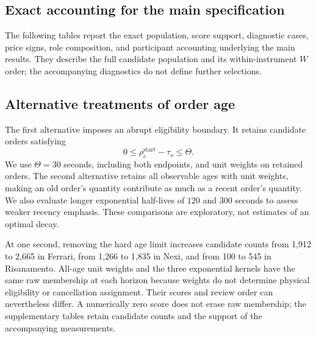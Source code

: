 \documentclass[11pt]{article}
\begin{document}
\subsection{Exact accounting for the main specification}
\label{subsec:main_results_accounting}
The following tables report the exact population, score support, diagnostic cases, price signs, role composition, and participant accounting underlying the main results. They describe the full candidate population and its within-instrument $W$ order; the accompanying diagnostics do not define further selections.


\FloatBarrier

\FloatBarrier

\FloatBarrier

\FloatBarrier

\FloatBarrier

\FloatBarrier

\subsection{Alternative treatments of order age}
The first alternative imposes an abrupt eligibility boundary. It retains candidate orders satisfying
\begin{equation}
    0 \leq \rho_c^{\mathrm{start}}-\tau_o \leq \Theta .
    \label{eq:deceptive_age_window}
\end{equation}
We use $\Theta=30$ seconds, including both endpoints, and unit weights on retained orders. The second alternative retains all observable ages with unit weights, making an old order's quantity contribute as much as a recent order's quantity. We also evaluate longer exponential half-lives of $120$ and $300$ seconds to assess weaker recency emphasis. These comparisons are exploratory, not estimates of an optimal decay.

At one second, removing the hard age limit increases candidate counts from 1,912 to 2,665 in Ferrari, from 1,266 to 1,835 in Nexi, and from 100 to 545 in Risanamento. All-age unit weights and the three exponential kernels have the same raw membership at each horizon because weights do not determine physical eligibility or cancellation assignment. Their scores and review order can nevertheless differ. A numerically zero score does not erase raw membership; the supplementary tables retain candidate counts and the support of the accompanying measurements.
\end{document}
